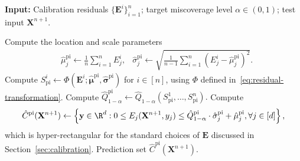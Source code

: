 \begin{algorithm}[!htb]
    \caption{Heuristic Plug-In Standardization}
    \label{alg:std-plug-in}
    \textbf{Input:} Calibration residuals $\{\mathbf{E}^i\}_{i=1}^{n}$; target miscoverage level $\alpha\in(0,1)$; test input $\mathbf{X}^{n+1}$.
    \begin{algorithmic}[1]
            \State Compute the location and scale parameters
            \begin{align*}
            & \hat{\mu}^{\mathrm{pi}}_j \gets \frac{1}{n}\sum_{i=1}^{n} E^i_j,
              & \hat{\sigma}^{\mathrm{pi}}_j \gets \sqrt{\frac{1}{n-1}\sum_{i=1}^{n}(E^i_j-\hat{\mu}^{\mathrm{pi}}_j)^2}.
            \end{align*}
            \EndFor
        \State Compute $S^i_{\mathrm{pi}} \gets \Phi(\mathbf{E}^i; \hat{\boldsymbol\mu}^{\mathrm{pi}},\hat{\boldsymbol\sigma}^{\mathrm{pi}})$ for $i \in [n]$, using $\Phi$ defined in~\eqref{eq:residual-transformation}.
        \State Compute $\hat{Q}^\mathrm{pi}_{1-\alpha}\gets \hat{Q}_{1-\alpha}(S^1_\mathrm{pi},\dots, S^n_\mathrm{pi}).$
        \State Compute 
            \begin{align*}
\hat{C}^{\mathrm{pi}}(\mathbf{X}^{n+1}) \gets \left\{\mathbf y \in \R^d: 0 \leq E_j(\mathbf{X}^{n+1}, y_j) \leq \hat{Q}^\mathrm{pi}_{1-\alpha}\cdot \hat{\sigma}^\mathrm{pi}_j + \hat{\mu}^\mathrm{pi}_j, \forall j \in [d]\right\},
            \end{align*}
            which is hyper-rectangular for the standard choices of $\mathbf E$ discussed in Section~\ref{sec:calibration}.
            \State \Return Prediction set $\hat{C}^{\mathrm{pi}}(\mathbf{X}^{n+1})$.
    \end{algorithmic}
\end{algorithm}

